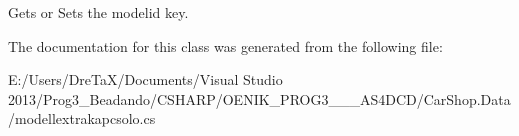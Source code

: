 Gets or Sets the modelid key. 



The documentation for this class was generated from the following file\+:\begin{DoxyCompactItemize}
\item 
E\+:/\+Users/\+Dre\+Ta\+X/\+Documents/\+Visual Studio 2013/\+Prog3\+\_\+\+Beadando/\+C\+S\+H\+A\+R\+P/\+O\+E\+N\+I\+K\+\_\+\+P\+R\+O\+G3\+\_\+\_\+\_\+\+A\+S4\+D\+C\+D/\+Car\+Shop.\+Data/modellextrakapcsolo.\+cs\end{DoxyCompactItemize}
